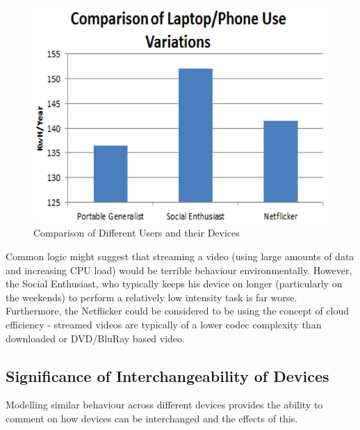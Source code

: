 \documentclass[conference]{IEEEtran}
\begin{document}
\begin{figure}[!ht]
\centering
\includegraphics[width=\columnwidth]{images/comparison_users_devices.png}
\caption{Comparison of Different Users and their Devices}
\label{fig:comparison_users_devices.png} 
\end{figure}

Common logic might suggest that streaming a video (using large amounts
of data and increasing CPU load) would be terrible behaviour
environmentally. However, the Social Enthusiast, who typically keeps
his device on longer (particularly on the weekends) to perform a
relatively low intensity task is far worse. Furthermore, the
Netflicker could be considered to be using the concept of cloud
efficiency - streamed videos are typically of a lower codec complexity
than downloaded or DVD/BluRay based video.

\subsection{Significance of Interchangeability of Devices}

Modelling similar behaviour across different devices provides the
ability to comment on how devices can be interchanged and the effects
of this.

\end{document}
